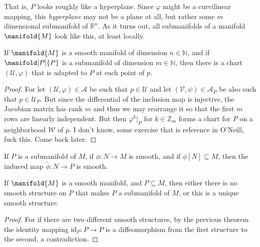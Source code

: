 \documentclass{article}                                                        %
\begin{document}
            That is, $P$ looks roughly like a hyperplane. Since $\varphi$ might
            be a curvilinear mapping, this \textit{hyperplane} may not be a
            plane at all, but rather some $m$ dimensional submanifold of
            $\mathbb{R}^{n}$. As it turns out, all submanifolds of a manifold
            $\manifold{M}$ look like this, at least locally.
            \begin{theorem}
                If $\manifold{M}$ is a smooth manifold of dimension
                $n\in\mathbb{N}$, and if $\manifold[P]{P}$ is a submanifold of
                dimension $m\in\mathbb{N}$, then there is a chart
                $(\mathcal{U},\varphi)$ that is adapted to $P$ at each point of
                $p$.
            \end{theorem}
            \begin{proof}
                For let $(\mathcal{U},\varphi)\in\mathcal{A}$ be such that
                $p\in\mathcal{U}$ and let $(\mathcal{V},\psi)\in\mathcal{A}_{P}$
                be also such that $p\in\mathcal{U}_{P}$. But since the
                differential of the inclusion map is injective, the Jacobian
                matrix has rank $m$ and thus we may rearrange it so that the
                first $m$ rows are linearly independent. But then
                $\varphi^{k}|_{P}$ for $k\in\mathbb{Z}_{m}$ forms a chart for
                $P$ on a neighborhood $\mathcal{W}$ of $p$. I don't know, some
                exercise that is reference in O'Neill, fuck this. Come back
                later.
            \end{proof}
            \begin{theorem}
                If $P$ is a submanifold of $M$, if $\phi:N\rightarrow{M}$ is
                smooth, and if $\phi[N]\subseteq{M}$, then the induced map
                $\tilde{\phi}:N\rightarrow{P}$ is smooth.
            \end{theorem}
            \begin{theorem}
                If $\manifold{M}$ is a smooth manifold, and $P\subseteq{M}$,
                then either there is no smooth structure on $P$ that makes $P$
                a submanifold of $M$, or this is a unique smooth structure.
            \end{theorem}
            \begin{proof}
                For if there are two different smooth structures, by the
                previous theorem the identity mapping
                $\textrm{id}_{P}:P\rightarrow{P}$ is a diffeomorphism from the
                first structure to the second, a contradiction.
            \end{proof}
\newpage
\end{document}
